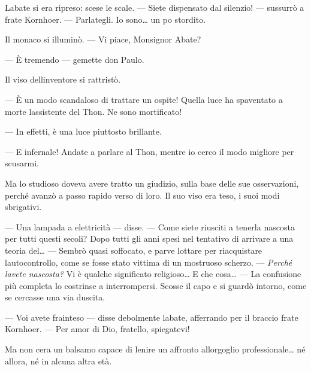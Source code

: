 L\textquotesingle abate si era ripreso: scese le scale. --- Siete
dispensato dal silenzio! --- sussurrò a frate Kornhoer. --- Parlategli.
Io sono\ldots{} un po\textquotesingle{} stordito.

Il monaco si illuminò. --- Vi piace, Monsignor Abate?

--- È tremendo --- gemette don Paulo.

Il viso dell\textquotesingle inventore si rattristò.

--- È un modo scandaloso di trattare un ospite! Quella luce ha
spaventato a morte l\textquotesingle assistente del Thon. Ne sono
mortificato!

--- In effetti, è una luce piuttosto brillante.

--- E infernale! Andate a parlare al Thon, mentre io cerco il modo
migliore per scusarmi.

Ma lo studioso doveva avere tratto un giudizio, sulla base delle sue
osservazioni, perché avanzò a passo rapido verso di loro. Il suo viso
era teso, i suoi modi sbrigativi.

--- Una lampada a elettricità --- disse. --- Come siete riusciti a
tenerla nascosta per tutti questi secoli? Dopo tutti gli anni spesi nel
tentativo di arrivare a una teoria del\ldots{} --- Sembrò quasi
soffocato, e parve lottare per riacquistare
l\textquotesingle autocontrollo, come se fosse stato vittima di un
mostruoso scherzo. --- \emph{Perché l\textquotesingle avete nascosta?}
Vi è qualche significato religioso\ldots{} E che cosa\ldots{} --- La
confusione più completa lo costrinse a interrompersi. Scosse il capo e
si guardò intorno, come se cercasse una via d\textquotesingle uscita.

--- Voi avete frainteso --- disse debolmente l\textquotesingle abate,
afferrando per il braccio frate Kornhoer. --- Per amor di Dio, fratello,
spiegatevi!

Ma non c\textquotesingle era un balsamo capace di lenire un affronto
all\textquotesingle orgoglio professionale\ldots{} né allora, né in
alcuna altra età.
